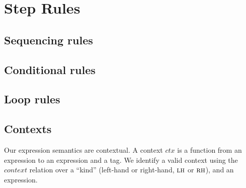 \documentclass{llncs}
\begin{document}
\section{Step Rules}
\label{app:rules}

\subsection{Sequencing rules}

\sequencing

\subsection{Conditional rules}

\conditionals

\subsection{Loop rules}

\loops

\subsection{Contexts}
\label{app:contexts}

Our expression semantics are contextual. A context \(\mathit{ctx}\) is a function from an
expression to an expression and a tag. We identify a valid context using the \(\mathit{context}\)
relation over a ``kind'' (left-hand or right-hand, \(\textnormal{\sc lh}\) or \(\textnormal{\sc rh}\)),
and an expression.
\end{document}
